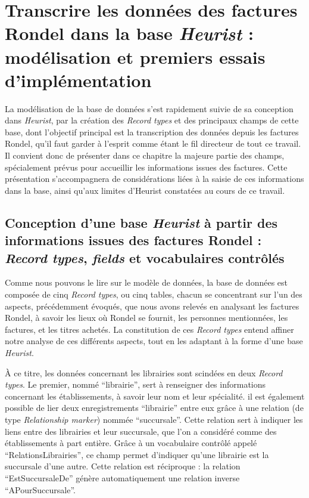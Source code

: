 \chapter{Transcrire les données des factures Rondel dans la base \emph{Heurist} : modélisation et premiers essais d'implémentation} 

La modélisation de la base de données s'est rapidement suivie de sa conception dans \emph{Heurist}, par la création des \emph{Record types} et des principaux champs de cette base, dont l'objectif principal est la transcription des données depuis les factures Rondel, qu'il faut garder à l'esprit comme étant le fil directeur de tout ce travail.
Il convient donc de présenter dans ce chapitre la majeure partie des champs, spécialement prévus pour accueillir les informations issues des factures. Cette présentation s'accompagnera de considérations liées à la saisie de ces informations dans la base, ainsi qu'aux limites d'Heurist constatées au cours de ce travail. 

\section{Conception d'une base \emph{Heurist} à partir des informations issues des factures Rondel : \emph{Record types}, \emph{fields} et vocabulaires contrôlés} 
\label{conception base}


Comme nous pouvons le lire sur le modèle de données, la base de données est composée de cinq \emph{Record types}, ou cinq tables, chacun se concentrant sur l'un des aspects, précédemment évoqués, que nous avons relevés en analysant les factures Rondel, à savoir les lieux où Rondel se fournit, les personnes mentionnées, les factures, et les titres achetés. 
La constitution de ces \emph{Record types} entend affiner notre analyse de ces différents aspects, tout en les adaptant à la forme d'une base \emph{Heurist}. 

À ce titre, les données concernant les librairies sont scindées en deux \emph{Record types}. Le premier, nommé \enquote{librairie}, sert à renseigner des informations concernant les établissements, à savoir leur nom et leur spécialité. il est également possible de lier deux enregistrements \enquote{librairie} entre eux grâce à une relation (de type \emph{Relationship marker}) nommée \enquote{succursale}. Cette relation sert à indiquer les liens entre des librairies et leur succursale, que l'on a considéré comme des établissements à part entière. Grâce à un vocabulaire contrôlé appelé \enquote{RelationsLibrairies}, ce champ permet d'indiquer qu'une librairie est la succursale d'une autre. Cette relation est réciproque : la relation \enquote{EstSuccursaleDe} génère automatiquement une relation inverse \enquote{APourSuccursale}. 

